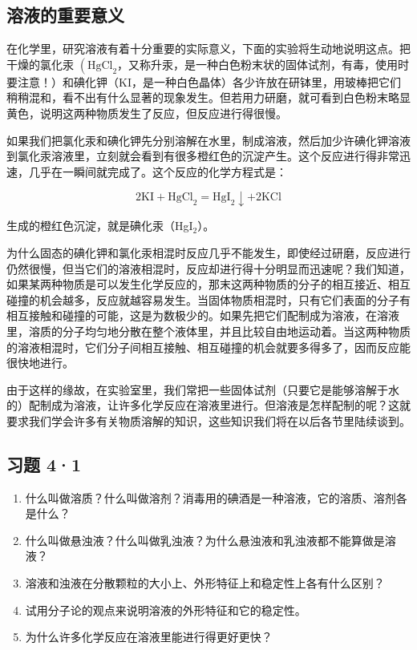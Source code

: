 \subsection{溶液的重要意义}

在化学里，研究溶液有着十分重要的实际意义，下面的实验将生动地说明这点。把干燥的氯化汞
\(\left(\mathrm{HgCl}_{2}\right.\)，又称升汞，是一种白色粉末状的固体试剂，有毒，使用时要注意！）和碘化钾（KI，是一种白色晶体）各少许放在研钵里，用玻棒把它们稍稍混和，看不出有什么显著的现象发生。但若用力研磨，就可看到白色粉末略显黄色，说明这两种物质发生了反应，但反应进行得很慢。

如果我们把氯化汞和碘化钾先分别溶解在水里，制成溶液，然后加少许碘化钾溶液到氯化汞溶液里，立刻就会看到有很多橙红色的沉淀产生。这个反应进行得非常迅速，几乎在一瞬间就完成了。这个反应的化学方程式是：

\[
2 \mathrm{KI} + \mathrm{HgCl}_{2} = \mathrm{HgI}_{2} \downarrow + 2 \mathrm{KCl}
\]

生成的橙红色沉淀，就是碘化汞（HgI\(_2\)）。

为什么固态的碘化钾和氯化汞相混时反应几乎不能发生，即使经过研磨，反应进行仍然很慢，但当它们的溶液相混时，反应却进行得十分明显而迅速呢？我们知道，如果某两种物质是可以发生化学反应的，那末这两种物质的分子的相互接近、相互碰撞的机会越多，反应就越容易发生。当固体物质相混时，只有它们表面的分子有相互接触和碰撞的可能，这是为数极少的。如果先把它们配制成为溶液，在溶液里，溶质的分子均匀地分散在整个液体里，并且比较自由地运动着。当这两种物质的溶液相混时，它们分子间相互接触、相互碰撞的机会就要多得多了，因而反应能很快地进行。

由于这样的缘故，在实验室里，我们常把一些固体试剂（只要它是能够溶解于水的）配制成为溶液，让许多化学反应在溶液里进行。但溶液是怎样配制的呢？这就要求我们学会许多有关物质溶解的知识，这些知识我们将在以后各节里陆续谈到。

\subsection{习题 4·1}

\begin{enumerate}
\item
  什么叫做溶质？什么叫做溶剂？消毒用的碘酒是一种溶液，它的溶质、溶剂各是什么？
\item
  什么叫做悬浊液？什么叫做乳浊液？为什么悬浊液和乳浊液都不能算做是溶液？
\item
  溶液和浊液在分散颗粒的大小上、外形特征上和稳定性上各有什么区别？
\item
  试用分子论的观点来说明溶液的外形特征和它的稳定性。
\item
  为什么许多化学反应在溶液里能进行得更好更快？
\end{enumerate}

